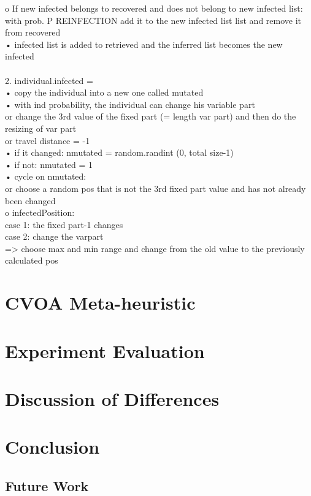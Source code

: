 \documentclass[letterpaper]{article}%
\begin{document}
o If new infected belongs to recovered and does not belong to new infected list:\\
with prob. P REINFECTION add it to the new infected list list and remove it from recovered\\
• infected list is added to retrieved and the inferred list becomes the new infected\\
\\
2. individual.infected =\\
• copy the individual into a new one called mutated\\
• with ind probability, the individual can change his variable part\\
or change the 3rd value of the fixed part (= length var part) and then do the resizing of var part\\
or travel distance = -1\\
• if it changed: nmutated = random.randint (0, total size-1)\\
• if not: nmutated = 1\\
• cycle on nmutated:\\
or choose a random pos that is not the 3rd fixed part value and has not already been changed\\
o infectedPosition:\\
case 1: the fixed part-1 changes\\
case 2: change the varpart\\
=> choose max and min range and change from the old value to the previously calculated pos\\

\section{CVOA Meta-heuristic}

\section{Experiment Evaluation}

\section{Discussion of Differences}

\section{Conclusion}

\subsection{Future Work}

\printbibliography
\end{document}
